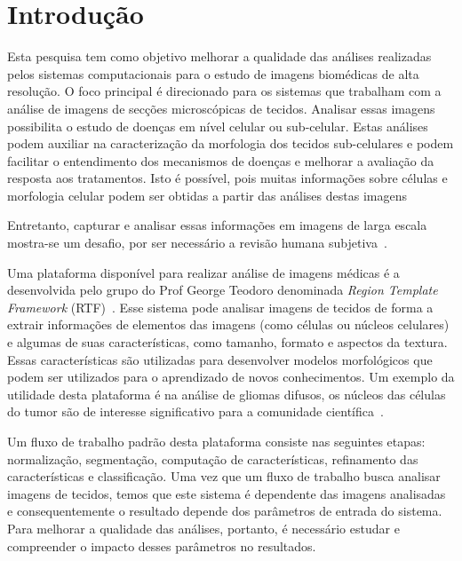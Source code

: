 \documentclass[a4paper,10pt]{article}
\begin{document}
	
	
\section{Introdução}\label{introducao}


Esta pesquisa tem como objetivo melhorar a qualidade das análises realizadas
pelos sistemas computacionais para o estudo de imagens biomédicas de alta
resolução. O foco principal é direcionado para os sistemas que trabalham com a
análise de imagens de secções microscópicas de tecidos. Analisar essas imagens
possibilita o estudo de doenças em nível celular ou sub-celular. Estas análises
podem auxiliar na caracterização da morfologia dos tecidos sub-celulares e
podem facilitar o entendimento dos mecanismos de doenças e melhorar a avaliação
da resposta aos tratamentos. Isto é possível, pois muitas
informações sobre células e morfologia celular podem ser obtidas a partir das
análises destas imagens~\cite{kong2010texture}

Entretanto, capturar e analisar essas informações em imagens de larga escala
mostra-se um desafio, por ser necessário a revisão humana
subjetiva~\cite{kong2011comprehensive}. 

Uma plataforma disponível para realizar análise de imagens médicas é a
desenvolvida pelo grupo do Prof George Teodoro denominada \textit{Region
Template Framework} (RTF)~\cite{teodoro2014region}. Esse sistema pode analisar
imagens de tecidos de forma a extrair informações de elementos das imagens
(como células ou núcleos celulares) e algumas de suas características, como
tamanho, formato e aspectos da textura. Essas características são utilizadas
para desenvolver modelos morfológicos que podem ser utilizados para o
aprendizado de novos conhecimentos. Um exemplo da utilidade desta plataforma é
na análise de gliomas difusos, os núcleos das células do tumor são de interesse
significativo para a comunidade científica~\cite{gupta2005clarifying}.

Um fluxo de trabalho padrão desta plataforma consiste nas seguintes etapas: normalização, segmentação, computação de características, refinamento das características e classificação. Uma vez que um fluxo de trabalho busca analisar imagens de tecidos, temos que este sistema é dependente das imagens analisadas e consequentemente o resultado depende dos parâmetros de entrada do sistema. Para melhorar a qualidade das análises, portanto, é necessário estudar e compreender o impacto desses parâmetros no resultados. 
\end{document}
